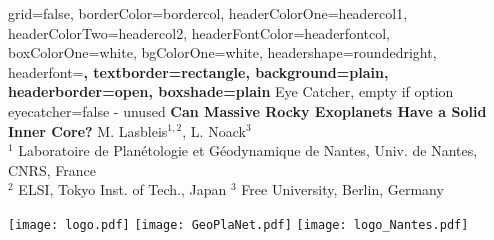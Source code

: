 \documentclass[a0paper,landscape]{baposter}
\begin{document}


\begin{poster}{
	grid=false,
	borderColor=bordercol,
	headerColorOne=headercol1,
	headerColorTwo=headercol2,
	headerFontColor=headerfontcol,
	boxColorOne=white, %
	bgColorOne=white,
	headershape=roundedright,
	headerfont=\Large\sf\bf,
	textborder=rectangle,
	background=plain,
	headerborder=open,
  boxshade=plain
}
{
	Eye Catcher, empty if option eyecatcher=false - unused
}
{\sf\bf
	Can Massive Rocky Exoplanets Have a Solid Inner Core? 
}
{
	\vspace{1em} M. Lasbleis$^{1,2}$, L. Noack$^3$\\
	{\smaller $^1$ Laboratoire de Plan\'etologie et G\'eodynamique de Nantes, Univ. de Nantes, CNRS, France \\$^2$ ELSI, Tokyo Inst. of Tech., Japan $^3$  Free University, Berlin, Germany}
}
{

		\begin{minipage}{0.20\textwidth}
		\hfill
		\texttt{[image: logo.pdf]}
		\hfill
         \texttt{[image: GeoPlaNet.pdf]}
         \hfill
         \texttt{[image: logo\_Nantes.pdf]}
         \hfill
         

\end{minipage}}
\end{poster}
\end{document}
